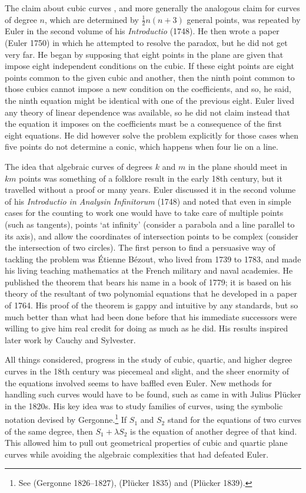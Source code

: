 \documentclass[11pt]{article}
\newcommand{\ha}{\frac{1}{2}}
\begin{document}
The claim about cubic curves , and more generally the analogous claim for curves of degree $n$, which are determined by $\ha n(n+3)$ general points, was repeated  by  Euler  in the second volume of his \emph{Introductio} (1748). He then wrote a paper (Euler 1750) in which he attempted to resolve the paradox, but  he did not get very far.  He began by supposing  that eight points in the plane are given that impose eight independent conditions on the cubic. If these eight points are eight points common to the given cubic and another, then the ninth point common to those cubics cannot impose a new condition on the coefficients, and so, he said, the ninth equation might be identical with one of the previous eight. 
Euler lived any theory of linear dependence was available, so he did not claim instead that the equation it imposes on the coefficients must be a consequence of the first eight equations. He did however solve the problem explicitly for those cases when five points do not determine a conic, which happens when four lie on a line.



The idea that algebraic curves of degrees $k$ and $m$ in the plane should meet in $km$ points was something of a folklore result in the early 18th century, but it travelled without a proof or many years. Euler discussed it in the second volume of his \emph{Introductio in Analysin Infinitorum} (1748) and noted that even in simple cases  for the counting to work one would have to take care of multiple points (such as tangents),  points `at infinity' (consider a parabola and a line parallel to its axis), and allow the  coordinates of intersection points to be complex (consider the intersection of two circles). The first person to find a persuasive way of tackling the problem was \'Etienne B\'ezout, who lived from 1739 to 1783, and made his living teaching mathematics at the French military and naval academies. He published the theorem that bears his name in a book of 1779; it is based on his theory of the resultant of two polynomial equations that he developed in a paper of 1764. His proof of the theorem is gappy and intuitive by any standards, but so much better than what had been done before that his immediate successors were willing to give him real credit for doing as much as he did. His results inspired later work by Cauchy and Sylvester.

All things considered, progress in the study of cubic, quartic, and higher degree curves in the 18th century was piecemeal and slight, and the sheer enormity of the equations involved seems to have baffled even Euler. New methods for handling such curves would have to be found, such as came in with Julius Pl\"ucker in the 1820s. His key idea was to study families of curves, using the symbolic notation devised by Gergonne.\footnote{See  (Gergonne 1826--1827), (Pl\"ucker 1835) and (Pl\"ucker 1839).} If $S_1$ and $S_2$ stand for the equations of two curves of the same degree, then $S_1 + \lambda S_2$ is the equation of another degree of that kind. This allowed him to pull out geometrical properties of cubic and quartic plane curves while avoiding the algebraic complexities that had defeated Euler.  
\end{document}
